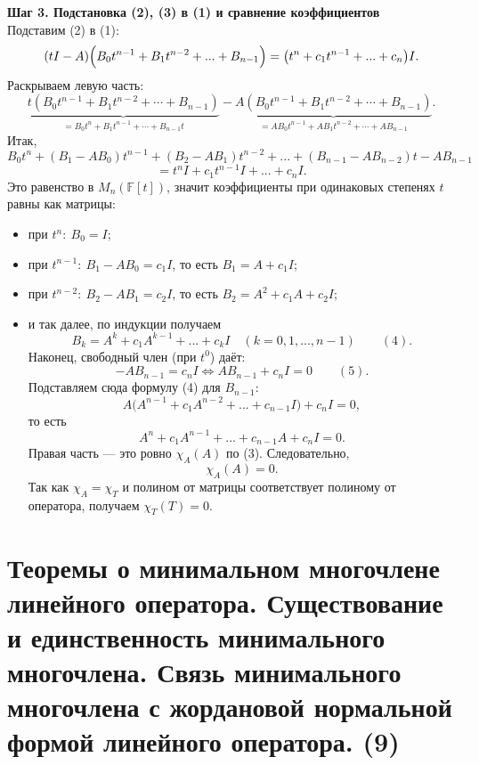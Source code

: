 \documentclass[14pt]{extreport}
\begin{document}
\begin{prbox}
        \textbf{Шаг 3. Подстановка (2), (3) в (1) и сравнение коэффициентов}\\
        Подставим (2) в (1):
        \[
        (tI-A) \Bigl( B_0t^{n-1} + B_1t^{n-2} + ... + B_{n-1} \Bigr) = \bigl( t^n + c_1t^{n-1} + ... + c_n \bigr) I.
        \]
        Раскрываем левую часть:
        \[
        \underbrace{t\left(B_0 t^{n-1} + B_1 t^{n-2} + \cdots + B_{n-1}\right)}_{= B_0 t^n + B_1 t^{n-1} + \cdots + B_{n-1} t} - \underbrace{A\left(B_0 t^{n-1} + B_1 t^{n-2} + \cdots + B_{n-1}\right)}_{= A B_0 t^{n-1} + A B_1 t^{n-2} + \cdots + A B_{n-1}}.
        \]
        Итак,
        \[
        B_0t^n + (B_1 - AB_0)t^{n-1} + (B_2 - AB_1)t^{n-2} + ... + (B_{n-1} - AB_{n-2})t - AB_{n-1} 
        \]
        \vspace{-1.2cm}
        \[
        = t^nI + c_1t^{n-1}I + ... + c_nI.
        \]
        Это равенство в $M_n(\mathbb{F}[t])$, значит коэффициенты при одинаковых степенях $t$ равны как матрицы:
        \begin{itemize}
            \item при $t^n:\ B_0=I$;
            \item при $t^{n-1}:\ B_1 - AB_0 = c_1I$, то есть $B_1 = A + c_1I$;
            \item при $t^{n-2}:\ B_2 - AB_1 = c_2I$, то есть $B_2 = A^2 + c_1A + c_2I$;
            \item и так далее, по индукции получаем
            \[
            B_k = A^k + c_1A^{k-1} + ... + c_kI \quad (k=0,1,...,n-1) \qquad (4).
            \]
            Наконец, свободный член (при $t^0$) даёт:
            \[
            -AB_{n-1} = c_nI \Leftrightarrow AB_{n-1} + c_nI = 0 \qquad (5).
            \]
            Подставляем сюда формулу (4) для $B_{n-1}$:
            \[
            A \bigl( A^{n-1} + c_1A^{n-2} + ... + c_{n-1}I \bigr) + c_nI = 0,
            \]
            то есть
            \[
            A^n + c_1A^{n-1} + ... + c_{n-1}A + c_nI = 0.
            \]
            Правая часть — это ровно $\chi_A(A)$ по (3). Следовательно,
            \[
            \chi_A(A) = 0.
            \]
            Так как $\chi_A = \chi_T$ и полином от матрицы соответствует полиному от оператора, получаем $\chi_T(T) = 0$.
        \end{itemize}
    \end{prbox}


    \chapter{Теоремы о минимальном многочлене линейного оператора. Существование и единственность минимального многочлена. Связь минимального многочлена с жордановой нормальной формой линейного оператора. (9)}
\end{document}
